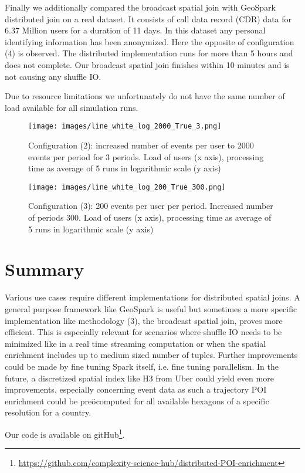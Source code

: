 \documentclass[conference]{IEEEtran}
\begin{document}
Finally we additionally compared the broadcast spatial join with GeoSpark distributed join on a real dataset.
It consists of call data record (CDR) data for 6.37 Million users for a duration of 11 days.
In this dataset any personal identifying information has been anonymized.
Here the opposite of configuration (4) is observed. The distributed implementation runs for more than 5 hours and does not complete.
Our broadcast spatial join finishes within 10 minutes and is not causing any shuffle IO.

Due to resource limitations we unfortunately do not have the same number of load available for all simulation runs.
\begin{figure}%
\centerline{\texttt{[image: images/line\_white\_log\_2000\_True\_3.png]}}
\caption{Configuration (2): increased number of events per user to 2000 events per period for 3 periods. Load of users (x axis), processing time as average of 5 runs in logarithmic scale (y axis)}
\label{fig:more_events}
\end{figure}
\begin{figure}%
\centerline{\texttt{[image: images/line\_white\_log\_200\_True\_300.png]}}
\caption{Configuration (3): 200 events per user per period. Increased number of periods 300. Load of users (x axis), processing time as average of 5 runs in logarithmic scale (y axis)}
\label{fig:more_periods}
\end{figure}

\section{Summary}
Various use cases require different implementations for distributed spatial joins.
A general purpose framework like GeoSpark is useful but sometimes a more specific implementation like methodology (3), the broadcast spatial join, proves more efficient.
This is especially relevant for scenarios where shuffle IO needs to be minimized like in a real time streaming computation or when the  spatial enrichment includes up to medium sized number of tuples.
Further improvements could be made by fine tuning Spark itself, i.e. fine tuning parallelism.
In the future, a discretized spatial index like H3 from Uber\cite{uber_h3} could yield even more improvements, especially concerning event data as such a trajectory POI enrichment could be preöcomputed for all available hexagons of a specific resolution for a country.


Our code is available on gitHub\footnote{\url{https://github.com/complexity-science-hub/distributed-POI-enrichment}}.

\printbibliography
\end{document}
